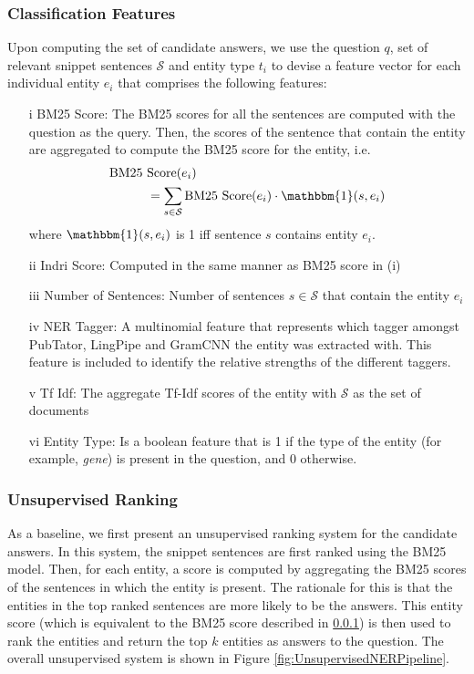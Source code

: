 \documentclass[11pt,a4paper]{article}
\begin{document}
\subsubsection{Classification Features}\label{sec:classification_features}

Upon computing the set of candidate answers, we use the question $q$, set of relevant snippet sentences $\mathcal{S}$ and entity type $t_i$ to devise a feature vector for each individual entity $e_i$ that comprises the following features:

\begin{enumerate}
    \item[i] BM25 Score: The BM25 scores for all the sentences are computed with the question as the query. Then, the scores of the sentence that contain the entity are aggregated to compute the BM25 score for the entity, i.e.
    \begin{align*}
        \text{BM25 }&\text{Score($e_i$)} \\
       &= \sum_{s \in \mathcal{S}} \text{BM25 Score($e_i$)} \cdot \mathbbm{1}(s, e_i)
    \end{align*}
    where $\mathbbm{1}(s, e_i)$ is 1 iff sentence $s$ contains entity $e_i$.
    \item[ii] Indri Score: Computed in the same manner as BM25 score in (i)
    \item[iii] Number of Sentences: Number of sentences $s \in \mathcal{S}$ that contain the entity $e_i$
    \item[iv] NER Tagger: A multinomial feature that represents which tagger amongst PubTator, LingPipe and GramCNN the entity was extracted with. This feature is included to identify the relative strengths of the different taggers.
    \item[v] Tf Idf: The aggregate Tf-Idf scores of the entity with $\mathcal{S}$ as the set of documents
    \item[vi] Entity Type: Is a boolean feature that is 1 if the type of the entity (for example, \textit{gene}) is present in the question, and 0 otherwise.

\end{enumerate}

\subsubsection{Unsupervised Ranking}

As a baseline, we first present an unsupervised ranking system for the candidate answers. In this system, the snippet sentences are first ranked using the BM25 model. Then, for each entity, a score is computed by aggregating the BM25 scores of the sentences in which the entity is present. The rationale for this is that the entities in the top ranked sentences are more likely to be the answers. This entity score (which is equivalent to the BM25 score described in \ref{sec:classification_features}) is then used to rank the entities and return the top $k$ entities as answers to the question. The overall unsupervised system is shown in Figure \ref{fig:UnsupervisedNERPipeline}.
\end{document}
